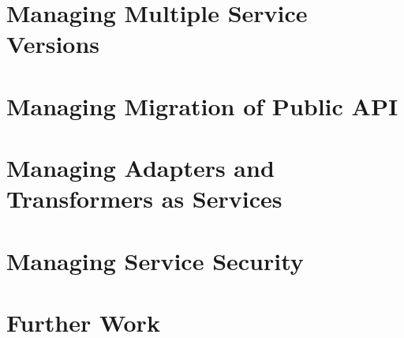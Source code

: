 
\section{Managing Multiple Service Versions}
\label{sec:esbd-multi-version-service}

\section{Managing Migration of Public API}
\label{sec:esbd-multi-stage-env}

\section{Managing Adapters and Transformers as Services}
\label{sec:esbd-adap-trans-service}

\section{Managing Service Security}
\label{sec:esbd-service-security}

\section{Further Work}
\label{sec:esbd-furhter-work}